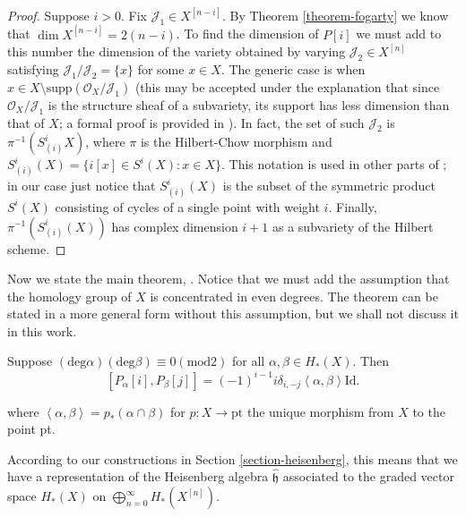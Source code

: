 \begin{proof}
Suppose $i>0$.
Fix $\mathcal{J}_1 \in X^{[n-i]}$.
By Theorem \ref{theorem-fogarty} we know that
$\dim X^{[n-i]}=2(n-i)$.
To find the dimension of $P[i]$
we must add to this number the dimension of the variety
obtained by varying  $\mathcal{J}_2 \in X^{[n]}$ 
satisfying $\mathcal{J}_1/\mathcal{J}_2=\{x\}$ 
for some $x \in X$.
The generic case is when 
$x \in X\setminus\text{supp}(\mathcal{O}_X/\mathcal{J}_1)$
(this may be accepted under the explanation
that since $\mathcal{O}_X/\mathcal{J}_1$ is the structure sheaf
of a subvariety, its support has less dimension than that of $X$;
a formal proof is provided in \cite[Lemma 8.31]{Nakajima-lectures}).
In fact, the set of such $\mathcal{J}_2$ is
$\pi^{-1}(S^i_{(i)}X)$, where $\pi$ is
the Hilbert-Chow morphism and
$S^i_{(i)}(X)=\{i[x] \in S^i(X):x \in X\}$.
This notation is used in other parts of \cite{Nakajima-lectures};
in our case just notice that $S^i_{(i)}(X)$
is the subset of the symmetric product $S^i(X)$ 
consisting of cycles of a single point with weight $i$.
Finally, $\pi^{-1}(S^i_{(i)}(X))$ has complex dimension $i+1$
as a subvariety of the Hilbert scheme.
\end{proof}

\medskip\noindent
Now we state the main theorem,
\cite[Theorem 8.13]{Nakajima-lectures}.
Notice that we must add the assumption that
the homology group of $X$ is concentrated in even degrees.
The theorem can be stated in a more general form without
this assumption, but we shall not discuss it in this work.
\begin{theorem}
\label{theorem-main}
Suppose $(\text{deg} \alpha)(\text{deg}\beta)\equiv 0 (\text{mod} 2)$
for all $\alpha,\beta \in H_*(X)$.
Then
\begin{equation}
\label{equation-main}
[P_\alpha[i],P_\beta[j]]=(-1)^{i-1}i \delta_{i,-j}
\left<\alpha,\beta\right>\text{Id}.
\end{equation}

\noindent
where $\left<\alpha,\beta\right>=p_*(\alpha \cap \beta)$
for $p:X \to \text{pt}$ the unique morphism
from $X$ to the point pt.
\end{theorem}

\medskip\noindent
According to our constructions in 
Section \ref{section-heisenberg},
this means that we have a representation of 
the Heisenberg algebra $\hat{\mathfrak{h}}$
associated to the graded vector space $H_*(X)$
on $\bigoplus_{n=0}^{\infty}H_{*}(X^{[n]})$.


